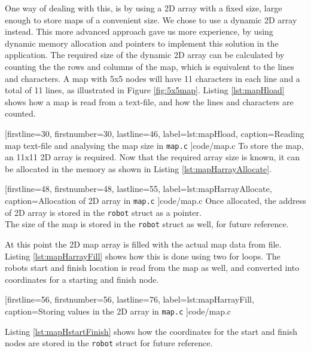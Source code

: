 {One way of dealing with this, is by using a 2D array with a fixed size, large enough to store maps of a convenient size. 
We chose to use a dynamic 2D array instead. 
This more advanced approach gave us more experience, by using dynamic memory allocation and pointers to implement this solution in the application.
\newpage
The required size of the dynamic 2D array can be calculated by counting the the rows and columns of the map,
which is equivalent to the lines and characters.
A map with 5x5 nodes will have 11 characters in each line and a total of 11 lines,
as illustrated in Figure \ref{fig:5x5map}. Listing \ref{lst:mapHload} shows how a map is read from a text-file, and how the lines and characters are counted.


[firstline=30,			%
firstnumber=30,			%
lastline=46,			%
label=lst:mapHload,		%
caption={Reading map text-file and analysing the map size in {\tt map.c}}
]{code/map.c}
To store the map, an 11x11 2D array is required.
Now that the required array size is known, it can be allocated in the memory as shown in Listing \ref{lst:mapHarrayAllocate}.


[firstline=48,			%
firstnumber=48,		%
lastline=55,			%
label=lst:mapHarrayAllocate,	%
caption={Allocation of 2D array in {\tt map.c}}
]{code/map.c}
Once allocated, the address of 2D array is stored in the {\tt robot} struct as a pointer.\\
The size of the map is stored in the {\tt robot} struct as well, for future reference.


\newpage
At this point the 2D map array is filled with the actual map data from file.
Listing \ref{lst:mapHarrayFill} shows how this is done using two for loops.
The robots start and finish location is read from the map as well,
and converted into coordinates for a starting and finish node.


[firstline=56,			%
firstnumber=56,		%
lastline=76,			%
label=lst:mapHarrayFill,	%
caption={Storing values in the 2D array in {\tt map.c}}
]{code/map.c}

Listing \ref{lst:mapHstartFinish} shows how the coordinates for the start and finish nodes are stored in the {\tt robot} struct for future reference. 

}
